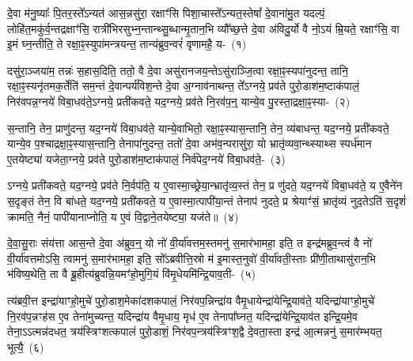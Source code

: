 \setcounter{anuvakam}{0}
दे॒वा म॑नु॒ष्याः᳚ पि॒तर॒स्ते᳚\-ऽन्यत॑ आस॒न्नसु॑रा॒ रक्षाꣳ॑सि पिशा॒चास्ते᳚\-ऽन्यत॒स्तेषां᳚ दे॒वाना॑मु॒त यदल्पं॒ लोहि॑त॒मकु॑र्व॒न्तद्रक्षाꣳ॑सि॒ रात्री॑भिरसुभ्न॒न्तान्थ्सु॒ब्धान्मृ॒तान॒भि व्यौ᳚च्छ॒त्ते दे॒वा अ॑विदु॒र्यो वै नो॒\-ऽयं म्रि॒यते॒ रक्षाꣳ॑सि॒ वा इ॒मं घ्न॒न्तीति॒ ते रक्षा॒ꣴ॒स्युपा॑मन्त्रयन्त॒ तान्य॑ब्रुव॒न्वरं॑ वृणामहै॒ य-~(१)\ip

दसु॑रा॒ञ्जया॑म॒ तन्नः॑ स॒हास॒दिति॒ ततो॒ वै दे॒वा असु॑रानजय॒न्ते\-ऽसु॑राञ्जि॒त्वा रक्षा॒ꣴ॒स्यपा॑नुदन्त॒ तानि॒ रक्षा॒ꣴ॒स्यनृ॑तमक॒र्तेति॑ सम॒न्तं दे॒वान्पर्य॑विश॒न्ते दे॒वा अ॒ग्नाव॑नाथन्त॒ ते᳚\-ऽग्नये॒ प्रव॑ते पुरो॒डाश॑\-म॒ष्टा\-क॑पालं॒ निर॑वपन्न॒ग्नये॑ विबा॒धव॑ते॒\-ऽग्नये॒ प्रती॑कवते॒ यद॒ग्नये॒ प्रव॑ते नि॒रव॑प॒न्॒ यान्ये॒व पु॒रस्ता॒द्रक्षा॒ꣴ॒स्या-~(२)\ip

स॒न्तानि॒ तेन॒ प्राणु॑दन्त॒ यद॒ग्नये॑ विबा॒धव॑ते॒ यान्ये॒वाभितो॒ रक्षा॒ꣴ॒स्यास॒न्तानि॒ तेन॒ व्य॑बाधन्त॒ यद॒ग्नये॒ प्रती॑कवते॒ यान्ये॒व प॒श्चाद्रक्षा॒ꣴ॒स्यास॒न्तानि॒ तेनापा॑नुदन्त॒ ततो॑ दे॒वा अभ॑व॒न्परासु॑रा॒ यो भ्रातृ॑व्यवा॒न्थ्स्याथ्स स्पर्ध॑मान ए॒तयेष्ट्या॑ यजेता॒ग्नये॒ प्रव॑ते पुरो॒डाश॑\-म॒ष्टा\-क॑पालं॒ निर्व॑पेद॒ग्नये॑ विबा॒धव॑ते॒-~(३)\ip

ऽग्नये॒ प्रती॑कवते॒ यद॒ग्नये॒ प्रव॑ते नि॒र्वप॑ति॒ य ए॒वास्मा॒\-च्छ्रेया॒न्भ्रातृ॑व्य॒स्तं तेन॒ प्र णु॑दते॒ यद॒ग्नये॑ विबा॒धव॑ते॒ य ए॒वैने॑न स॒दृङ्तं तेन॒ वि बा॑धते॒ यद॒ग्नये॒ प्रती॑कवते॒ य ए॒वास्मा॒त्पापी॑या॒न्तं तेनाप॑ नुदते॒ प्र श्रेयाꣳ॑सं॒ भ्रातृ॑व्यं नुद॒ते\-ऽति॑ स॒दृशं॑ क्रामति॒ नैनं॒ पापी॑यानाप्नोति॒ य ए॒वं वि॒द्वाने॒तयेष्ट्या॒ यज॑ते॥~(४)\ip

{\anuvakamend[{वृ॒णा॒म॒है॒ यत्पु॒रस्ता॒द्रक्षाꣳ॑सि वपेद॒ग्नये॑ विबा॒धव॑त ए॒वं च॒त्वारि॑ च}]}

दे॒वा॒सु॒राः संय॑त्ता आस॒न्ते दे॒वा अ॑ब्रुव॒न्॒ यो नो॑ वी॒र्या॑वत्तम॒स्तमनु॑ स॒मार॑भामहा॒ इति॒ त इन्द्र॑मब्रुव॒न्त्वं वै नो॑ वी॒र्या॑वत्तमो\-ऽसि॒ त्वामनु॑ स॒मार॑भामहा॒ इति॒ सो᳚\-ऽब्रवीत्ति॒स्रो म॑ इ॒मास्त॒नुवो॑ वी॒र्या॑वती॒स्ताः प्री॑णी॒ताथासु॑रान॒भि भ॑विष्य॒थेति॒ ता वै ब्रू॒हीत्य॑ब्रुवन्नि॒यमꣳ॑हो॒मुगि॒यं वि॑मृ॒धेयमि॑न्द्रि॒याव॒ती-~(५)\ip

त्य॑ब्रवी॒त्त इन्द्रा॑याꣳहो॒मुचे॑ पुरो॒डाश॒मेका॑\-दश\-कपालं॒ निर॑वप॒न्निन्द्रा॑य वैमृ॒धायेन्द्रा॑ये\-न्द्रि॒याव॑ते॒ यदिन्द्रा॑याꣳहो॒मुचे॑ नि॒रव॑प॒न्नꣳह॑स ए॒व तेना॑मुच्यन्त॒ यदिन्द्रा॑य वैमृ॒धाय॒ मृध॑ ए॒व तेनापा᳚घ्नत॒ यदिन्द्रा॑येन्द्रि॒याव॑त इन्द्रि॒यमे॒व तेना॒\-ऽऽ\-त्मन्न॑दधत॒ त्रय॑स्त्रिꣳशत्कपालं पुरो॒डाशं॒ निर॑वप॒न्त्रय॑स्त्रिꣳश॒द्वै दे॒वता॒स्ता इन्द्र॑ आ॒त्मन्ननु॑ स॒मार॑म्भयत॒ भूत्यै॒~(६)\ip

